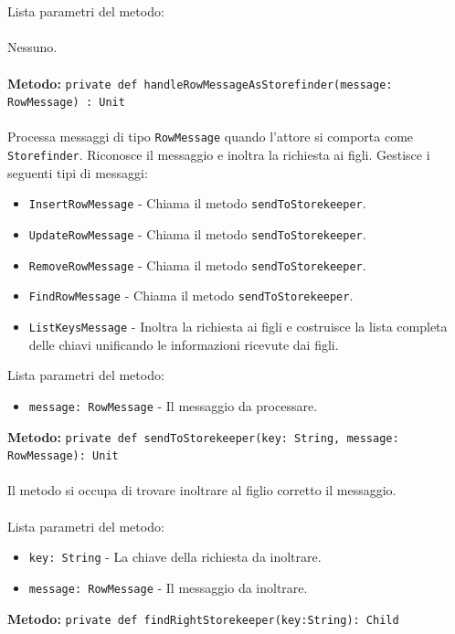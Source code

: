 \documentclass[a4paper]{article}
\begin{document}
			\\ \\
			Lista parametri del metodo:
			\\ \\
			Nessuno.
			\\ \\
		\textbf{Metodo: }\texttt{private def handleRowMessageAsStorefinder(message: RowMessage) : Unit}
			\\ \\
			Processa messaggi di tipo \texttt{RowMessage} quando l'attore si comporta come \texttt{Storefinder}. Riconosce il messaggio e inoltra la richiesta ai figli.
			Gestisce i seguenti tipi di messaggi:
			\begin{itemize}
				\item \texttt{InsertRowMessage} - Chiama il metodo \texttt{sendToStorekeeper}.
				\item \texttt{UpdateRowMessage} - Chiama il metodo \texttt{sendToStorekeeper}.
				\item \texttt{RemoveRowMessage} - Chiama il metodo \texttt{sendToStorekeeper}.
				\item \texttt{FindRowMessage} - Chiama il metodo \texttt{sendToStorekeeper}.
				\item \texttt{ListKeysMessage} - Inoltra la richiesta ai figli e costruisce la lista completa delle chiavi unificando le informazioni ricevute dai figli.
			\end{itemize}
			Lista parametri del metodo:
			\begin{itemize}
				\item \texttt{message: RowMessage} - Il messaggio da processare.
			\end{itemize}
		\textbf{Metodo: }\texttt{private def sendToStorekeeper(key: String, message: RowMessage): Unit}
			\\ \\
			Il metodo si occupa di trovare inoltrare al figlio corretto il messaggio.
			\\ \\
			Lista parametri del metodo:
			\begin{itemize}
				\item \texttt{key: String} - La chiave della richiesta da inoltrare.
				\item \texttt{message: RowMessage} - Il messaggio da inoltrare.
			\end{itemize}
		\textbf{Metodo: }\texttt{private def findRightStorekeeper(key:String): Child}
			\\ \\
\end{document}
